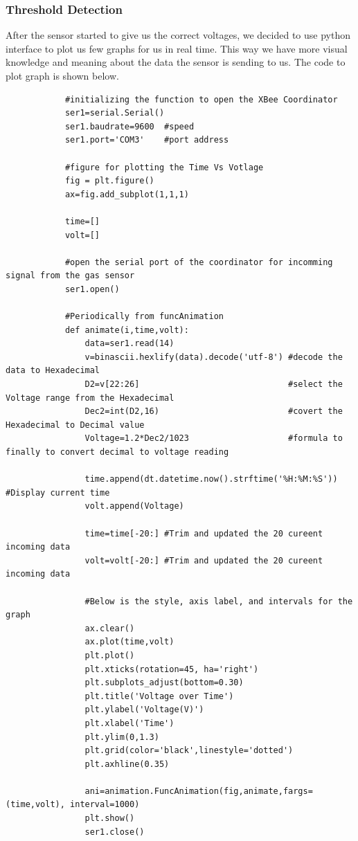 		\subsubsection{Threshold Detection}
			\par After the sensor started to give us the correct voltages, we decided to use python interface to plot us few graphs for us in real time. This way we have more visual knowledge and meaning about the data the sensor is sending to us. The code to plot graph is shown below.
			\begin{lstlisting}
			#initializing the function to open the XBee Coordinator		
			ser1=serial.Serial()		
			ser1.baudrate=9600  #speed		
			ser1.port='COM3'    #port address
						
			#figure for plotting the Time Vs Votlage			
			fig = plt.figure()			
			ax=fig.add_subplot(1,1,1)
						
			time=[]			
			volt=[]
						
			#open the serial port of the coordinator for incomming signal from the gas sensor			
			ser1.open()
					
			#Periodically from funcAnimation			
			def animate(i,time,volt):			
				data=ser1.read(14)			
				v=binascii.hexlify(data).decode('utf-8') #decode the data to Hexadecimal			
				D2=v[22:26]                              #select the Voltage range from the Hexadecimal
				Dec2=int(D2,16)                          #covert the Hexadecimal to Decimal value			
				Voltage=1.2*Dec2/1023                    #formula to finally to convert decimal to voltage reading
							
				time.append(dt.datetime.now().strftime('%H:%M:%S')) #Display current time 			
				volt.append(Voltage)
						
				time=time[-20:] #Trim and updated the 20 cureent incoming data 			
				volt=volt[-20:] #Trim and updated the 20 cureent incoming data 
				
				#Below is the style, axis label, and intervals for the graph
				ax.clear()
			    ax.plot(time,volt) 				
				plt.plot()				
				plt.xticks(rotation=45, ha='right')				
				plt.subplots_adjust(bottom=0.30)				
				plt.title('Voltage over Time')				
				plt.ylabel('Voltage(V)')				
				plt.xlabel('Time')				
				plt.ylim(0,1.3)				
				plt.grid(color='black',linestyle='dotted')
				plt.axhline(0.35)
				
				ani=animation.FuncAnimation(fig,animate,fargs=(time,volt), interval=1000)
				plt.show()
				ser1.close()
			\end{lstlisting}
